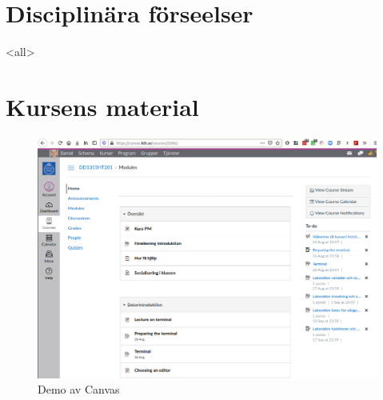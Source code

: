 \section{Disciplinära förseelser}

\mode<all>{}



\section{Kursens material}

\begin{frame}
  \begin{figure}
    \includegraphics[height=0.8\textheight]{canvas.png}
    \caption{Demo av Canvas}
  \end{figure}
\end{frame}

